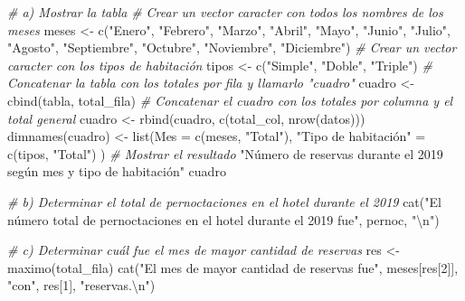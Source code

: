 \documentclass[
]{book}
\newenvironment{Shaded}{\begin{snugshade}}{\end{snugshade}}
\newcommand{\AttributeTok}[1]{\textcolor[rgb]{0.77,0.63,0.00}{#1}}
\newcommand{\CommentTok}[1]{\textcolor[rgb]{0.56,0.35,0.01}{\textit{#1}}}
\newcommand{\DecValTok}[1]{\textcolor[rgb]{0.00,0.00,0.81}{#1}}
\newcommand{\FunctionTok}[1]{\textcolor[rgb]{0.00,0.00,0.00}{#1}}
\newcommand{\NormalTok}[1]{#1}
\newcommand{\OtherTok}[1]{\textcolor[rgb]{0.56,0.35,0.01}{#1}}
\newcommand{\SpecialCharTok}[1]{\textcolor[rgb]{0.00,0.00,0.00}{#1}}
\newcommand{\StringTok}[1]{\textcolor[rgb]{0.31,0.60,0.02}{#1}}
\begin{document}
\begin{Shaded}
\begin{Highlighting}[]
\CommentTok{\# a) Mostrar la tabla}
\CommentTok{\# Crear un vector caracter con todos los nombres de los meses}
\NormalTok{meses }\OtherTok{\textless{}{-}} \FunctionTok{c}\NormalTok{(}\StringTok{"Enero"}\NormalTok{, }\StringTok{"Febrero"}\NormalTok{, }\StringTok{"Marzo"}\NormalTok{, }\StringTok{"Abril"}\NormalTok{,}
           \StringTok{"Mayo"}\NormalTok{, }\StringTok{"Junio"}\NormalTok{, }\StringTok{"Julio"}\NormalTok{, }\StringTok{"Agosto"}\NormalTok{,}
           \StringTok{"Septiembre"}\NormalTok{, }\StringTok{"Octubre"}\NormalTok{, }\StringTok{"Noviembre"}\NormalTok{, }\StringTok{"Diciembre"}\NormalTok{)}
\CommentTok{\# Crear un vector caracter con los tipos de habitación}
\NormalTok{tipos }\OtherTok{\textless{}{-}} \FunctionTok{c}\NormalTok{(}\StringTok{"Simple"}\NormalTok{, }\StringTok{"Doble"}\NormalTok{, }\StringTok{"Triple"}\NormalTok{)}
\CommentTok{\# Concatenar la tabla con los totales por fila y llamarlo "cuadro"}
\NormalTok{cuadro }\OtherTok{\textless{}{-}} \FunctionTok{cbind}\NormalTok{(tabla, total\_fila)}
\CommentTok{\# Concatenar el cuadro con los totales por columna y el total general}
\NormalTok{cuadro }\OtherTok{\textless{}{-}} \FunctionTok{rbind}\NormalTok{(cuadro, }\FunctionTok{c}\NormalTok{(total\_col, }\FunctionTok{nrow}\NormalTok{(datos)))}
\FunctionTok{dimnames}\NormalTok{(cuadro) }\OtherTok{\textless{}{-}} \FunctionTok{list}\NormalTok{(}\AttributeTok{Mes =} \FunctionTok{c}\NormalTok{(meses, }\StringTok{"Total"}\NormalTok{), }
                         \StringTok{"Tipo de habitación"} \OtherTok{=} \FunctionTok{c}\NormalTok{(tipos, }\StringTok{"Total"}\NormalTok{) )}
\CommentTok{\# Mostrar el resultado}
\StringTok{"Número de reservas durante el 2019 según mes y tipo de habitación"}
\NormalTok{cuadro}

\CommentTok{\# b) Determinar el total de pernoctaciones en el hotel durante el 2019}
\FunctionTok{cat}\NormalTok{(}\StringTok{"El número total de pernoctaciones en el hotel durante el 2019 fue"}\NormalTok{, pernoc, }\StringTok{"}\SpecialCharTok{\textbackslash{}n}\StringTok{"}\NormalTok{)}

\CommentTok{\# c) Determinar cuál fue el mes de mayor cantidad de reservas}
\NormalTok{res }\OtherTok{\textless{}{-}} \FunctionTok{maximo}\NormalTok{(total\_fila)}
\FunctionTok{cat}\NormalTok{(}\StringTok{"El mes de mayor cantidad de reservas fue"}\NormalTok{, meses[res[}\DecValTok{2}\NormalTok{]], }\StringTok{"con"}\NormalTok{, }
\NormalTok{    res[}\DecValTok{1}\NormalTok{], }\StringTok{"reservas.}\SpecialCharTok{\textbackslash{}n}\StringTok{"}\NormalTok{)}


\end{Highlighting}
\end{Shaded}
\end{document}
